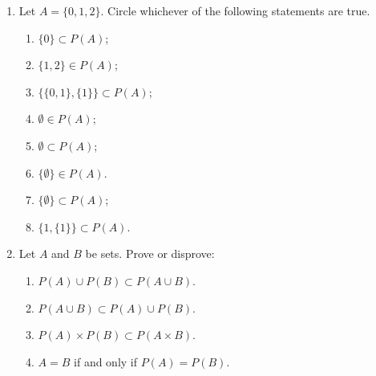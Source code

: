 \documentclass[12pt, reqno]{amsart}
\begin{document}
\begin{enumerate}
\begin{enumerate}
\item Let $A = \{0,1,2\}$. Circle whichever of the following statements
 are true.

 \begin{enumerate}
 \item $\{0\} \subset P(A)$;\vspace{0.3cm}
 \item $\{1,2\} \in P(A)$;\vspace{0.3cm}
 \item $\{\{0,1\},\{1\}\} \subset P(A)$;\vspace{0.3cm}
 \item $\emptyset \in P(A)$;\vspace{0.3cm}
 \item $\emptyset \subset P(A)$;\vspace{0.3cm}
 \item $\{\emptyset\} \in P(A)$. \vspace{0.3cm}
 \item $\{\emptyset\} \subset P(A)$;\vspace{0.3cm}
 \item $\{1,\{1\}\} \subset P(A)$.\\
 \end{enumerate}

\item Let $A$ and $B$ be sets. Prove or disprove:

 \begin{enumerate}
 \item $P(A) \cup P(B) \subset P(A \cup B)$.
 \item $P(A \cup B) \subset P(A) \cup P(B)$.
 \item $P(A) \times P(B) \subset P(A \times B)$.
 \item $A = B$ if and only if $P(A) = P(B)$.
 \end{enumerate}

\end{enumerate}



\end{enumerate}
\end{document}
